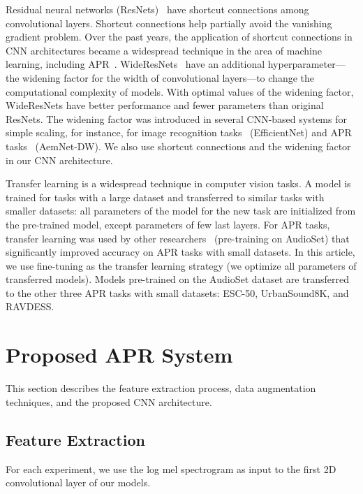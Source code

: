 \documentclass{article}
\begin{document}
\begin{sloppy}
Residual neural networks (ResNets)~\cite{7780459} have shortcut connections among convolutional layers. Shortcut connections help partially avoid the vanishing gradient problem. Over the past years, the application of shortcut connections in CNN architectures became a widespread technique in the area of machine learning, including APR~\cite{9229505, 9413035, Guzhov2021ESResNeXtfbspLR}. WideResNets~\cite{zagoruyko2017wide} have an additional hyperparameter---the widening factor for the width of convolutional layers---to change the computational complexity of models. With optimal values of the widening factor, WideResNets have better performance and fewer parameters than original ResNets. The widening factor was introduced in several CNN-based systems for simple scaling, for instance, for image recognition tasks~\cite{pmlr-v97-tan19a} (EfficientNet) and APR tasks~\cite{9414229} (AemNet-DW). We also use shortcut connections and the widening factor in our CNN architecture. 

Transfer learning is a widespread technique in computer vision tasks. A model is trained for tasks with a large dataset and transferred to similar tasks with smaller datasets: all parameters of the model for the new task are initialized from the pre-trained model, except parameters of few last layers. For APR tasks, transfer learning was used by other researchers~\cite{gong21b_interspeech, 9229505, 9414229, Guzhov2021ESResNeXtfbspLR} (pre-training on AudioSet) that significantly improved accuracy on APR tasks with small datasets. In this article, we use fine-tuning as the transfer learning strategy (we optimize all parameters of transferred models). Models pre-trained on the AudioSet dataset are transferred to the other three APR tasks with small datasets: ESC-50, \hbox{UrbanSound8K}, and RAVDESS.


\section{Proposed APR System}
\label{section3}
This section describes the feature extraction process, data augmentation techniques, and the proposed CNN architecture.

\subsection{Feature Extraction}
\label{section31}
For each experiment, we use the log mel spectrogram as input to the first 2D convolutional layer of our models.


\end{sloppy}
\end{document}
